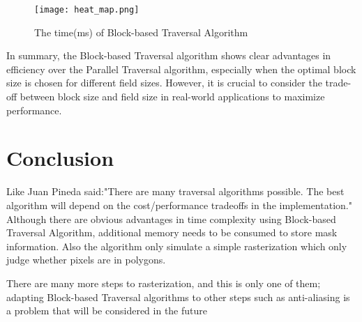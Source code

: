 \documentclass[
	a4paper, %
	10pt, %
	unnumberedsections, %
	twoside, %
]{LTJournalArticle}
\begin{document}
\begin{figure}[H] %
	\texttt{[image: heat\_map.png]}
	\caption{The time(ms) of Block-based Traversal Algorithm}
\end{figure}

In summary, the Block-based Traversal algorithm shows clear advantages in efficiency over the Parallel Traversal algorithm, especially when the optimal block size is chosen for different field sizes. However, it is crucial to consider the trade-off between block size and field size in real-world applications to maximize performance.


\section{Conclusion}

Like Juan Pineda said:"There are many traversal algorithms possible. The best algorithm will depend on the cost/performance tradeoffs in the implementation."\cite{pineda1988} Although there are obvious advantages in time complexity using Block-based Traversal Algorithm, additional memory needs to be consumed to store mask information. Also the algorithm only simulate a simple rasterization which only judge whether pixels are in polygons. 

There are many more steps to rasterization, and this is only one of them; adapting Block-based Traversal algorithms to other steps such as anti-aliasing is a problem that will be considered in the future



\printbibliography

\end{document}
